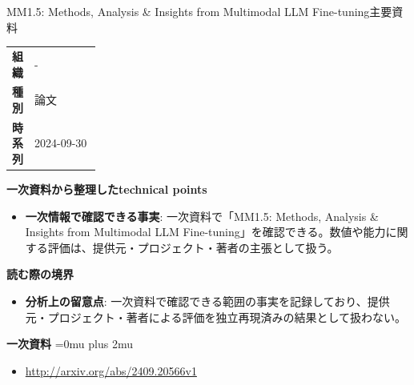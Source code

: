 \begin{technicalnote}{MM1.5: Methods, Analysis \& Insights from Multimodal LLM Fine-tuning}{主要資料}
\begingroup
\begin{tabularx}{\linewidth}{@{}>{\bfseries}p{0.22\linewidth}X@{}}
組織 & - \\
種別 & 論文 \\
時系列 & 2024-09-30 \\
\end{tabularx}
\smallskip
{\bfseries 一次資料から整理したtechnical points}
\begin{itemize}[leftmargin=1.5em,itemsep=0.35em]
\item \textbf{一次情報で確認できる事実}: 一次資料で「MM1.5: Methods, Analysis \& Insights from Multimodal LLM Fine-tuning」を確認できる。数値や能力に関する評価は、提供元・プロジェクト・著者の主張として扱う。
\end{itemize}
\begin{minipage}{\linewidth}
{\bfseries 読む際の境界}
\begin{itemize}[leftmargin=1.5em,itemsep=0.35em]
\item \textbf{分析上の留意点}: 一次資料で確認できる範囲の事実を記録しており、提供元・プロジェクト・著者による評価を独立再現済みの結果として扱わない。
\end{itemize}
\begin{samepage}
{\bfseries 一次資料}
\begingroup\sloppy
\Urlmuskip=0mu plus 2mu\relax
\begin{itemize}[leftmargin=1.5em,itemsep=0.25em]
\item {\scriptsize\url{http://arxiv.org/abs/2409.20566v1}}
\end{itemize}
\endgroup
\end{samepage}
\end{minipage}
\endgroup
\end{technicalnote}
\medskip

